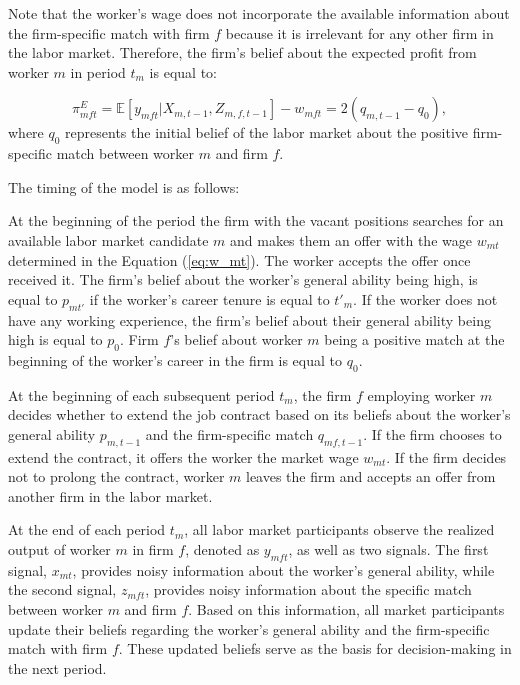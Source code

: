 \documentclass[12pt]{article}
\begin{document}
Note that the worker's wage does not incorporate the available information about the firm-specific match with firm $f$ because it is irrelevant for any other firm in the labor market. Therefore, the firm's belief about the expected profit from worker $m$ in period $t_m$ is equal to:

\begin{equation}\label{eq:profit_NR}
\pi^E_{mft} = \mathbb{E}[y_{mft} | X_{m,t-1}, Z_{m,f,t-1}] - w_{mft} = 2(q_{m,t-1} - q_0),
\end{equation}
where $q_0$ represents the initial belief of the labor market about the positive firm-specific match between worker $m$ and firm $f$.

The timing of the model is as follows:

At the beginning of the period the firm with the vacant positions searches for an available labor market candidate $m$ and makes them an offer with the wage $w_{mt}$ determined in the Equation (\ref{eq:w_mt}). The worker accepts the offer once received it. The firm's belief about the worker's general ability being high, is equal to $p_{mt'}$ if the worker's career tenure is equal to $t'_m$. If the worker does not have any working experience, the firm's belief about their general ability being high is equal to $p_0$. Firm $f$'s belief about worker $m$ being a positive match at the beginning of the worker's career in the firm is equal to $q_0$.

At the beginning of each subsequent period $t_m$, the firm $f$ employing worker $m$ decides whether to extend the job contract based on its beliefs about the worker's general ability $p_{m,t-1}$ and the firm-specific match $q_{mf,t-1}$. If the firm chooses to extend the contract, it offers the worker the market wage $w_{mt}$. If the firm decides not to prolong the contract, worker $m$ leaves the firm and accepts an offer from another firm in the labor market.

At the end of each period $t_m$, all labor market participants observe the realized output of worker $m$ in firm $f$, denoted as $y_{mft}$, as well as two signals. The first signal, $x_{mt}$, provides noisy information about the worker's general ability, while the second signal, $z_{mft}$, provides noisy information about the specific match between worker $m$ and firm $f$. Based on this information, all market participants update their beliefs regarding the worker's general ability and the firm-specific match with firm $f$. These updated beliefs serve as the basis for decision-making in the next period.
\end{document}
